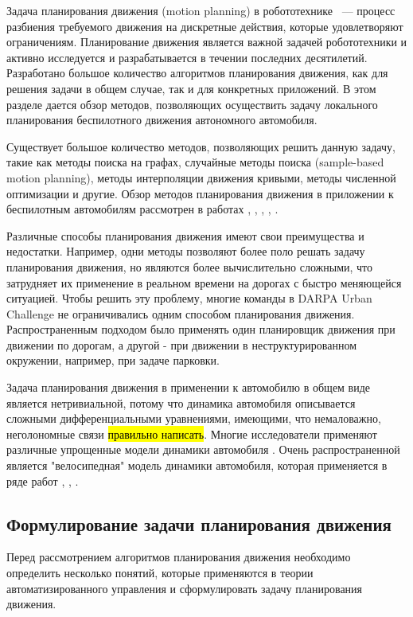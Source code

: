Задача планирования движения (motion planning) в робототехнике ~--- процесс разбиения требуемого движения
на дискретные действия, которые удовлетворяют ограничениям. Планирование движения является важной задачей
робототехники и активно  исследуется и разрабатывается в течении последних десятилетий. Разработано большое
количество алгоритмов планирования движения, как для решения задачи в общем случае, так и для конкретных
приложений. В этом разделе дается обзор методов, позволяющих осуществить задачу локального планирования
беспилотного движения автономного автомобиля.

Существует большое количество методов, позволяющих решить данную задачу, такие как методы поиска на графах,
случайные методы поиска (sample-based motion planning), методы интерполяции движения кривыми, методы
численной оптимизации и другие. Обзор методов планирования движения в приложении к беспилотным автомобилям
рассмотрен в работах \cite{motion_planning_review},
\cite{motion_planning_overview_obstacles}, \cite{motion_planning_overview_modern},
\cite{motion_planning_review_2}, \cite{motion_planning_review_3}.

Различные способы планирования движения имеют свои преимущества и недостатки. Например, одни методы позволяют
более поло решать задачу планирования движения, но являются более вычислительно сложными, что затрудняет их
применение в реальном времени на дорогах с быстро меняющейся ситуацией.  Чтобы решить эту проблему, многие
команды в DARPA Urban Challenge не ограничивались одним способом планирования движения. Распространенным подходом
было применять один планировщик движения при движении по дорогам, а другой - при движении в неструктурированном окружении,
например, при задаче парковки.

Задача планирования движения в применении к автомобилю в общем виде является нетривиальной, потому что
динамика автомобиля описывается сложными дифференциальными уравнениями, имеющими, что немаловажно,
неголономные связи \cite{car_frund}\hl{правильно написать}. Многие исследователи применяют различные упрощенные модели динамики
автомобиля \cite{car_dynamics_1}. Очень распространенной является "велосипедная" модель динамики
автомобиля, которая применяется в ряде работ \cite{car_dynamics_bycicle_model_1}, \cite{car_dynamics_bycicle_model_2},
\cite{darpa_annieway_navigation}.


\subsection{Формулирование задачи планирования движения}
Перед рассмотрением алгоритмов планирования движения необходимо определить несколько понятий, которые
применяются в теории автоматизированного управления и сформулировать задачу планирования движения.

